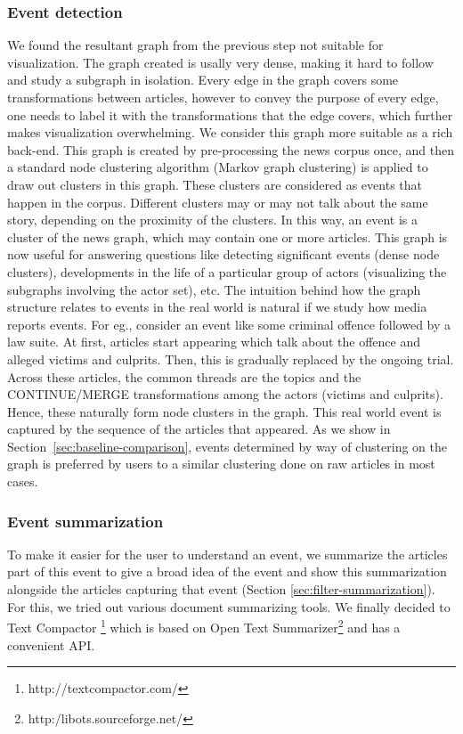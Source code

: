 \subsubsection*{Event detection}
We found the resultant graph from the previous step not suitable for visualization. The graph created is usally very dense, making it hard to follow and study a subgraph in isolation.
Every edge in the graph covers some transformations between articles, however to convey the purpose of every edge, one needs to label it with the transformations that the edge covers, 
which further makes visualization overwhelming. 
We consider this graph more suitable as a rich back-end.
This graph is created by pre-processing the news corpus once, and then a standard node clustering algorithm (Markov graph clustering) is applied to draw out clusters in this graph. 
These clusters are considered as events that happen in the corpus. Different clusters may or may not talk about the same story, depending on the proximity of the clusters.
In this way, an event is a cluster of the news graph, which may contain one or more articles. 
This graph is now useful for answering questions like detecting significant events (dense node clusters), developments in the life of a particular group of actors (visualizing the subgraphs 
involving the actor set), etc. The intuition behind how the graph structure relates to events in the real world is natural if we study how media reports events. 
For eg., consider an event like some criminal offence followed by a law suite. At first, articles start appearing which talk about the offence and alleged victims and culprits. Then, this is gradually
replaced by the ongoing trial. Across these articles, the common threads are the topics and the CONTINUE/MERGE transformations among the actors (victims and culprits). Hence, these naturally form node clusters in the graph. This real world event is captured 
by the sequence of the articles that appeared.
As we show in Section~\ref{sec:baseline-comparison}, events determined by way of clustering on the graph is preferred by users to a similar clustering
done on raw articles in most cases.
\subsubsection*{Event summarization}
To make it easier for the user to understand an event, we summarize the articles part of this event to give a broad idea of the event and show this summarization alongside the articles capturing that event (Section \ref{sec:filter-summarization}). For this, we tried out various document summarizing tools. We finally decided to Text Compactor \footnote{http://textcompactor.com/} which is based on Open Text Summarizer\footnote{http:/libots.sourceforge.net/} and has a convenient API. 
